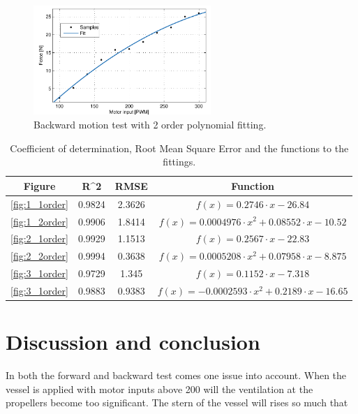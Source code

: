 \begin{figure}[htbp]
	\centering
	\includegraphics[width=0.6\textwidth]{plot/both_force_3_2order}
	\caption{Backward motion test with 2 order polynomial fitting.}
	\label{fig:3_2order}
\end{figure}

\begin{table}[htbp]
\centering
\begin{tabular}{cccc}
	\toprule
  Figure & R^2 & RMSE & Function\\
  \midrule
  \ref{fig:1_1order} & 0.9824 & 2.3626 & $f(x)=0.2746\cdot x-26.84$\\
  \ref{fig:1_2order} & 0.9906 & 1.8414 & $f(x)=0.0004976\cdot x^2+0.08552\cdot x-10.52$\\
  \ref{fig:2_1order} & 0.9929 & 1.1513 & $f(x)=0.2567\cdot x-22.83$\\
  \ref{fig:2_2order} & 0.9994 & 0.3638 & $f(x)=0.0005208\cdot x^2+0.07958\cdot x-8.875$\\
  \ref{fig:3_1order} & 0.9729 & 1.345 & $f(x)=0.1152\cdot x-7.318$\\
  \ref{fig:3_1order} & 0.9883 & 0.9383 & $f(x)=-0.0002593\cdot x^2+0.2189\cdot x-16.65$\\
  \bottomrule
\end{tabular}
\caption{Coefficient of determination, Root Mean Square Error and the functions to the fittings.}
\label{tab:fitting}
\end{table}

\section{Discussion and conclusion}
In both the forward and backward test comes one issue into account. When the vessel is applied with motor inputs above 200 will the ventilation at the propellers become too significant. The stern of the vessel will rises so much that
